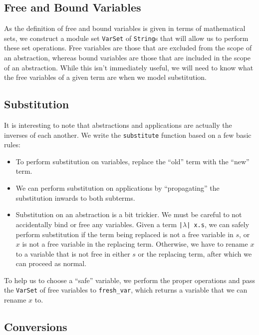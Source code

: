 \documentclass[12pt,letterpaper]{article}
\begin{document}
\subsection{Free and Bound Variables}

As the definition of free and bound variables is given in terms of mathematical sets, we construct a module set \texttt{VarSet} of \texttt{String}s that will allow us to perform these set operations.
Free variables are those that are excluded from the scope of an abstraction, whereas bound variables are those that are included in the scope of an abstraction.
While this isn't immediately useful, we will need to know what the free variables of a given term are when we model substitution.

\subsection{Substitution}

It is interesting to note that abstractions and applications are actually the inverses of each another.
We write the \texttt{substitute} function based on a few basic rules:
\begin{itemize}
  \item To perform substitution on variables, replace the \enquote{old} term with the \enquote{new} term.
  \item We can perform substitution on applications by \enquote{propagating} the substitution inwards to both subterms.
  \item Substitution on an abstraction is a bit trickier.
    We must be careful to not accidentally bind or free any variables.
    Given a term \texttt{|$\lambda$| x.s}, we can safely perform substitution if the term being replaced is not a free variable in $s$, or $x$ is not a free variable in the replacing term.
    Otherwise, we have to rename $x$ to a variable that is not free in either $s$ or the replacing term, after which we can proceed as normal.
\end{itemize}
To help us to choose a \enquote{safe} variable, we perform the proper operations and pass the \texttt{VarSet} of free variables to \texttt{fresh_var}, which returns a variable that we can rename $x$ to.

\subsection{Conversions}
\end{document}
